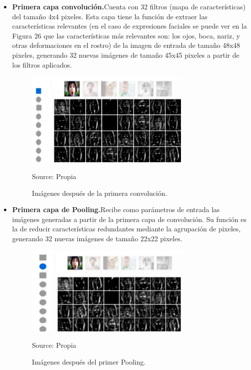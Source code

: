\vspace{0.5cm}

\begin{itemize}
\item
{
\textbf{Primera capa convolución.}Cuenta con 32 filtros (mapa de características) del
tamaño 4x4 pixeles. Esta capa tiene la función de extraer las características
relevantes (en el caso de expresiones faciales se puede ver en la Figura 26 que las
características más relevantes son: los ojos, boca, nariz, y otras deformaciones en
el rostro) de la imagen de entrada de tamaño 48x48 pixeles, generando 32 nuevas
imágenes de tamaño 45x45 pixeles a partir de los filtros aplicados.
\begin{figure}[H]
		\centering
		\includegraphics[width=80mm]{./Imagenes/filtro1.png}
		\caption{Imágenes después de la primera convolución.}
		Source: Propia
		\label{fig:filtro1}
\end{figure}
}

\item
{
\textbf{Primera capa de Pooling.}Recibe como parámetros de entrada
las imágenes generadas a partir de la primera capa de convolución. Su función es
la de reducir características redundantes mediante la agrupación de pixeles,
generando 32 nuevas imágenes de tamaño 22x22 pixeles.
\begin{figure}[H]
		\centering
		\includegraphics[width=80mm]{./Imagenes/filtro2.png}
		\caption{Imágenes después del primer Pooling.}
		Source: Propia
		\label{fig:filtro2}
\end{figure}
}


\end{itemize}
